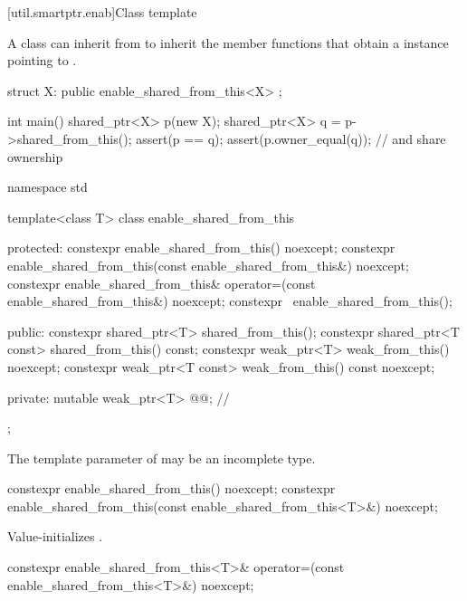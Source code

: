 [util.smartptr.enab]{Class template }

\pnum
{}%
A class  can inherit from 
to inherit the  member functions that obtain
a  instance pointing to .

\pnum
\begin{example}
\begin{codeblock}
struct X: public enable_shared_from_this<X> { };

int main() {
  shared_ptr<X> p(new X);
  shared_ptr<X> q = p->shared_from_this();
  assert(p == q);
  assert(p.owner_equal(q));                         //  and  share ownership
}
\end{codeblock}
\end{example}

\begin{codeblock}
namespace std {
  template<class T> class enable_shared_from_this {
  protected:
    constexpr enable_shared_from_this() noexcept;
    constexpr enable_shared_from_this(const enable_shared_from_this&) noexcept;
    constexpr enable_shared_from_this& operator=(const enable_shared_from_this&) noexcept;
    constexpr ~enable_shared_from_this();

  public:
    constexpr shared_ptr<T> shared_from_this();
    constexpr shared_ptr<T const> shared_from_this() const;
    constexpr weak_ptr<T> weak_from_this() noexcept;
    constexpr weak_ptr<T const> weak_from_this() const noexcept;

  private:
    mutable weak_ptr<T> @@;  // \expos
  };
}
\end{codeblock}

\pnum
The template parameter  of 
may be an incomplete type.

%
\begin{itemdecl}
constexpr enable_shared_from_this() noexcept;
constexpr enable_shared_from_this(const enable_shared_from_this<T>&) noexcept;
\end{itemdecl}

\begin{itemdescr}
\pnum
\effects
Value-initializes .
\end{itemdescr}

%
\begin{itemdecl}
constexpr enable_shared_from_this<T>& operator=(const enable_shared_from_this<T>&) noexcept;
\end{itemdecl}

